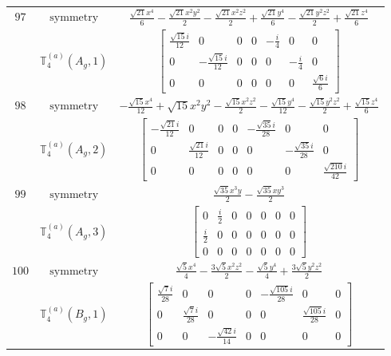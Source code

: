 \documentclass[fleqn,8pt,landscape]{jsarticle}
\begin{document}
\begin{longtable}{ccc}
$ 97 $ & $ \text{symmetry} $ & $ \frac{\sqrt{21} x^{4}}{6} - \frac{\sqrt{21} x^{2} y^{2}}{2} - \frac{\sqrt{21} x^{2} z^{2}}{2} + \frac{\sqrt{21} y^{4}}{6} - \frac{\sqrt{21} y^{2} z^{2}}{2} + \frac{\sqrt{21} z^{4}}{6} $ \\
$  $ & $ \mathbb{T}_{4}^{(a)}(A_{g},1) $ & $ \begin{bmatrix} \frac{\sqrt{15} i}{12} & 0 & 0 & 0 & - \frac{i}{4} & 0 & 0 \\ 0 & - \frac{\sqrt{15} i}{12} & 0 & 0 & 0 & - \frac{i}{4} & 0 \\ 0 & 0 & 0 & 0 & 0 & 0 & \frac{\sqrt{6} i}{6} \end{bmatrix} $ \\ \hline
$ 98 $ & $ \text{symmetry} $ & $ - \frac{\sqrt{15} x^{4}}{12} + \sqrt{15} x^{2} y^{2} - \frac{\sqrt{15} x^{2} z^{2}}{2} - \frac{\sqrt{15} y^{4}}{12} - \frac{\sqrt{15} y^{2} z^{2}}{2} + \frac{\sqrt{15} z^{4}}{6} $ \\
$  $ & $ \mathbb{T}_{4}^{(a)}(A_{g},2) $ & $ \begin{bmatrix} - \frac{\sqrt{21} i}{12} & 0 & 0 & 0 & - \frac{\sqrt{35} i}{28} & 0 & 0 \\ 0 & \frac{\sqrt{21} i}{12} & 0 & 0 & 0 & - \frac{\sqrt{35} i}{28} & 0 \\ 0 & 0 & 0 & 0 & 0 & 0 & \frac{\sqrt{210} i}{42} \end{bmatrix} $ \\ \hline
$ 99 $ & $ \text{symmetry} $ & $ \frac{\sqrt{35} x^{3} y}{2} - \frac{\sqrt{35} x y^{3}}{2} $ \\
$  $ & $ \mathbb{T}_{4}^{(a)}(A_{g},3) $ & $ \begin{bmatrix} 0 & \frac{i}{2} & 0 & 0 & 0 & 0 & 0 \\ \frac{i}{2} & 0 & 0 & 0 & 0 & 0 & 0 \\ 0 & 0 & 0 & 0 & 0 & 0 & 0 \end{bmatrix} $ \\ \hline
$ 100 $ & $ \text{symmetry} $ & $ \frac{\sqrt{5} x^{4}}{4} - \frac{3 \sqrt{5} x^{2} z^{2}}{2} - \frac{\sqrt{5} y^{4}}{4} + \frac{3 \sqrt{5} y^{2} z^{2}}{2} $ \\
$  $ & $ \mathbb{T}_{4}^{(a)}(B_{g},1) $ & $ \begin{bmatrix} \frac{\sqrt{7} i}{28} & 0 & 0 & 0 & - \frac{\sqrt{105} i}{28} & 0 & 0 \\ 0 & \frac{\sqrt{7} i}{28} & 0 & 0 & 0 & \frac{\sqrt{105} i}{28} & 0 \\ 0 & 0 & - \frac{\sqrt{42} i}{14} & 0 & 0 & 0 & 0 \end{bmatrix} $ \\ \hline

\end{longtable}
\end{document}
